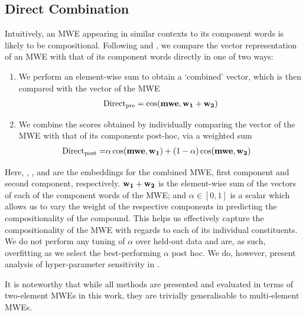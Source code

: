 \subsection{Direct Combination}
\label{sec:direct}
Intuitively, an MWE appearing in similar contexts to its component words is likely to be compositional. Following \cite{Salehi2015} and \cite{Reddy2011}, we compare the vector representation of an MWE with that of its component words directly in one of two ways:
\begin{enumerate}
    \item We perform an element-wise sum to obtain a `combined' vector, which is then compared with the vector of the MWE
    \begin{eqnarray}
    \text{Direct}_{\text{pre}} =  \cos(\mathbf{mwe}, \mathbf{w_1} + \mathbf{w_2})
\end{eqnarray}
    \item We combine the scores obtained by individually comparing the vector of the MWE with that of its components post-hoc, via a weighted sum
    \begin{eqnarray}
    \text{Direct}_{\text{post}} = & \alpha \cos(\mathbf{mwe}, \mathbf{w_1}) +  
     (1 - \alpha) \cos(\mathbf{mwe}, \mathbf{w_2})
    \end{eqnarray}
\end{enumerate}

Here, \MWEvec, \MWEonevec, and \MWEtwovec are the embeddings for the combined MWE, first component and second component, respectively. $\mathbf{w_1} + \mathbf{w_2}$ is the element-wise sum of the vectors of each of the component words of the MWE; and $\alpha \in [0,1]$ is a scalar which allows us to vary the weight of the respective components in predicting the compositionality of the compound. This helps us effectively capture the compositionality of the MWE with regards to each of its individual constituents. We do not perform any tuning of $\alpha$ over held-out data and are, as such, overfitting as we select the best-performing $\alpha$ post hoc. We do, however, present analysis of hyper-parameter sensitivity in .

It is noteworthy that while all methods are presented and evaluated in terms of two-element MWEs in this work, they are trivially generalisable to multi-element MWEs.

